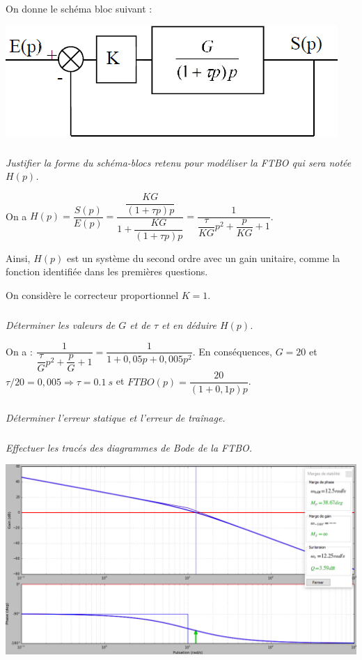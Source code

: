 \documentclass[10pt,fleqn]{article} %
\begin{document}
\begin{multicols}{2}
\begin{obj}
\end{obj}


On donne le schéma bloc suivant :

\begin{center}
\includegraphics[width=.6\linewidth]{images/fig_02}
\end{center}

\fi

\subparagraph{}\textit{Justifier la forme du schéma-blocs retenu pour modéliser la FTBO qui sera notée $H(p)$.}
\ifprof
\begin{corrige}
On a $H(p)=\dfrac{S(p)}{E(p)}
=\dfrac{\dfrac{KG}{\left(1+\tau p\right)p}}{1+\dfrac{KG}{\left(1+\tau p\right)p}}
=\dfrac{1}{\dfrac{\tau}{KG} p^2+\dfrac{p}{KG}+1}$.

Ainsi, $H(p)$ est un système du second ordre avec un gain unitaire, comme la fonction identifiée dans les premières questions. 
\end{corrige}
\else
\fi

On considère le correcteur proportionnel $K=1$. 
\subparagraph{}\textit{Déterminer les valeurs de $G$ et de $\tau$ et en déduire $H(p)$.}
\ifprof
\begin{corrige}
On a :
$\dfrac{1}{\dfrac{\tau}{G} p^2+\dfrac{p}{G}+1}
= \dfrac{1}{1+0,05p+0,005p^2}$. En conséquences, $G=20$ et $\tau/20=0,005 \Rightarrow \tau=\SI{0,1}{s}$ et $FTBO(p)=\dfrac{20}{(1+0,1p)p}$.

\end{corrige}
\else
\fi

\subparagraph{}\textit{Déterminer l'erreur statique et l'erreur de traînage.}

\subparagraph{}\textit{Effectuer les tracés des diagrammes de Bode de la FTBO.}
\ifprof
\begin{corrige}

\begin{center}
\includegraphics[width=\linewidth]{images/cor_01}
\end{center}
\end{corrige}
\else
\fi


\end{multicols}
\end{document}

